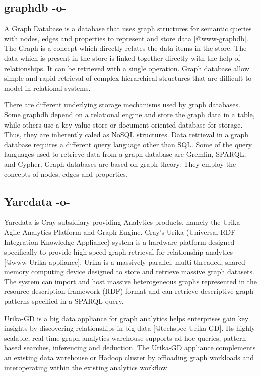      
\subsection{graphdb -o-}

A Graph Database is a database that uses graph structures for semantic
queries with nodes, edges and properties to represent and store data
 [@www-graphdb]. The Graph is a concept which directly relates the
data items in the store.  The data which is present in the store is
linked together directly with the help of relationships. It can be
retrieved with a single operation.  Graph database allow simple and
rapid retrieval of complex hierarchical structures that are difficult
to model in relational systems.

There are different underlying storage mechanisms used by graph
databases.  Some graphdb depend on a relational engine and store the
graph data in a table, while others use a key-value store or
document-oriented database for storage. Thus, they are inherently
caled as NoSQL structures.  Data retrieval in a graph database
requires a different query language other than SQL. Some of the query
languages used to retrieve data from a graph database are Gremlin,
SPARQL, and Cypher.  Graph databases are based on graph theory. They
employ the concepts of nodes, edges and properties.


     
\subsection{Yarcdata -o-}

Yarcdata is Cray subsidiary providing Analytics products, namely the
Urika Agile Analytics Platform and Graph Engine. Cray's Urika
(Universal RDF Integration Knowledge Appliance) system is a hardware
platform designed specifically to provide high-speed graph-retrieval
for relationship analytics [@www-Urika-appliance].  Urika is a
massively parallel, multi-threaded, shared-memory computing device
designed to store and retrieve massive graph datasets. The system can
import and host massive heterogeneous graphs represented in the
resource description framework (RDF) format and can retrieve
descriptive graph patterns specified in a SPARQL query.

Urika-GD is a big data appliance for graph analytics helps enterprises
gain key insights by discovering relationships in big
data [@techspec-Urika-GD].  Its highly scalable, real-time graph
analytics warehouse supports ad hoc queries, pattern-based searches,
inferencing and deduction. The Urika-GD appliance complements an
existing data warehouse or Hadoop cluster by offloading graph
workloads and interoperating within the existing analytics workflow

